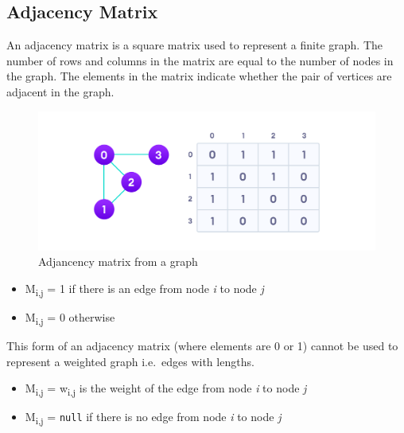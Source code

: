 \documentclass[
]{book}
\providecommand{\tightlist}{%
  \setlength{\itemsep}{0pt}\setlength{\parskip}{0pt}}
\begin{document}
\hypertarget{adjacency-matrix}{%
\subsection{Adjacency Matrix}\label{adjacency-matrix}}

An adjacency matrix is a square matrix used to represent a finite graph. The number of rows and columns in the matrix are equal to the number of nodes in the graph. The elements in the matrix indicate whether the pair of vertices are adjacent in the graph.

\begin{figure}

{\centering \includegraphics{img/01-image02} 

}

\caption{Adjancency matrix from a graph}\label{fig:adj-matrix}
\end{figure}

\begin{itemize}
\tightlist
\item
  M\textsubscript{i,j} = 1 if there is an edge from node \emph{i} to node \emph{j}
\item
  M\textsubscript{i,j} = 0 otherwise
\end{itemize}

This form of an adjacency matrix (where elements are 0 or 1) cannot be used to represent a weighted graph i.e.~edges with lengths.

\begin{itemize}
\tightlist
\item
  M\textsubscript{i,j} = w\textsubscript{i,j} is the weight of the edge from node \emph{i} to node \emph{j}
\item
  M\textsubscript{i,j} = \texttt{null} if there is no edge from node \emph{i} to node \emph{j}
\end{itemize}
\end{document}
